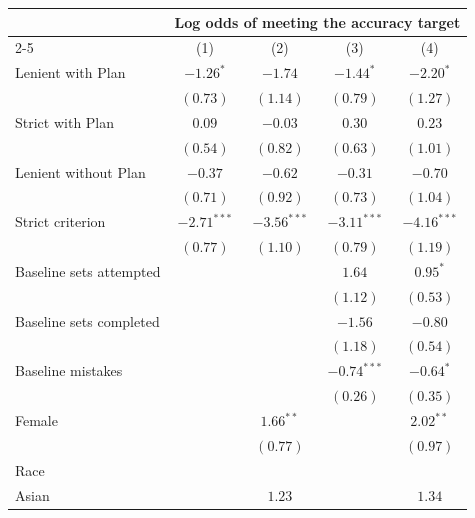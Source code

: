 \begin{tabular}{l c c c c}
\toprule
 & \multicolumn{4}{c}{Log odds of meeting the accuracy target} \\
\cmidrule(lr){2-5}
 & (1) & (2) & (3) & (4) \\
\midrule
Lenient with Plan        & $-1.26^{*}$   & $-1.74$       & $-1.44^{*}$   & $-2.20^{*}$   \\
                         & $(0.73)$      & $(1.14)$      & $(0.79)$      & $(1.27)$      \\
Strict with Plan         & $0.09$        & $-0.03$       & $0.30$        & $0.23$        \\
                         & $(0.54)$      & $(0.82)$      & $(0.63)$      & $(1.01)$      \\
Lenient without Plan     & $-0.37$       & $-0.62$       & $-0.31$       & $-0.70$       \\
                         & $(0.71)$      & $(0.92)$      & $(0.73)$      & $(1.04)$      \\
Strict criterion         & $-2.71^{***}$ & $-3.56^{***}$ & $-3.11^{***}$ & $-4.16^{***}$ \\
                         & $(0.77)$      & $(1.10)$      & $(0.79)$      & $(1.19)$      \\
Baseline sets attempted  &               &               & $1.64$        & $0.95^{*}$    \\
                         &               &               & $(1.12)$      & $(0.53)$      \\
Baseline sets completed  &               &               & $-1.56$       & $-0.80$       \\
                         &               &               & $(1.18)$      & $(0.54)$      \\
Baseline mistakes        &               &               & $-0.74^{***}$ & $-0.64^{*}$   \\
                         &               &               & $(0.26)$      & $(0.35)$      \\
Female                   &               & $1.66^{**}$   &               & $2.02^{**}$   \\
                         &               & $(0.77)$      &               & $(0.97)$      \\
Race                     &               &               &               &               \\
\quad Asian              &               & $1.23$        &               & $1.34$        \\

\end{tabular}
